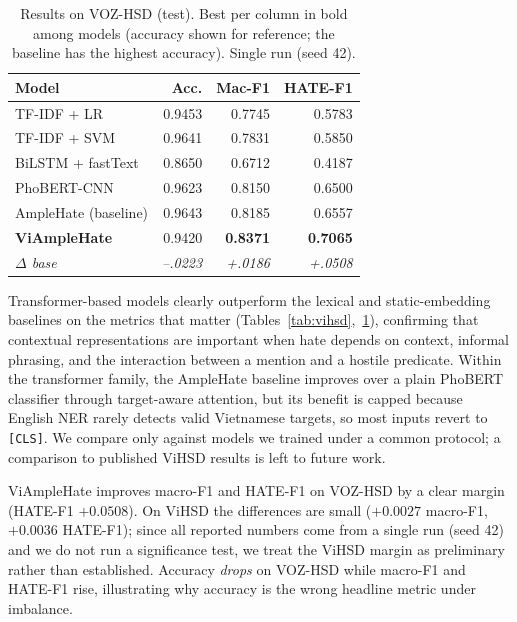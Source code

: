 \documentclass[11pt]{article}
\begin{document}
\begin{table}[t]
  \centering
  \small
  \begin{tabular}{lrrr}
    \toprule
    \textbf{Model} & \textbf{Acc.} & \textbf{Mac-F1} & \textbf{HATE-F1} \\
    \midrule
    TF-IDF + LR          & 0.9453 & 0.7745 & 0.5783 \\
    TF-IDF + SVM         & 0.9641 & 0.7831 & 0.5850 \\
    BiLSTM + fastText    & 0.8650 & 0.6712 & 0.4187 \\
    PhoBERT-CNN          & 0.9623 & 0.8150 & 0.6500 \\
    AmpleHate (baseline) & 0.9643 & 0.8185 & 0.6557 \\
    \textbf{ViAmpleHate} & 0.9420 & \textbf{0.8371} & \textbf{0.7065} \\
    \textit{$\Delta$ base} & \textit{--.0223} & \textit{+.0186} & \textit{+.0508} \\
    \bottomrule
  \end{tabular}
  \caption{Results on VOZ-HSD (test). Best per column in bold among models (accuracy shown for reference; the baseline has the highest accuracy). Single run (seed 42).}
  \label{tab:voz}
\end{table}

Transformer-based models clearly outperform the lexical and static-embedding baselines on the metrics that matter (Tables~\ref{tab:vihsd},~\ref{tab:voz}), confirming that contextual representations are important when hate depends on context, informal phrasing, and the interaction between a mention and a hostile predicate. Within the transformer family, the AmpleHate baseline improves over a plain PhoBERT classifier through target-aware attention, but its benefit is capped because English NER rarely detects valid Vietnamese targets, so most inputs revert to \texttt{[CLS]}. We compare only against models we trained under a common protocol; a comparison to published ViHSD results is left to future work.

ViAmpleHate improves macro-F1 and HATE-F1 on VOZ-HSD by a clear margin (HATE-F1 $+0.0508$). On ViHSD the differences are small ($+0.0027$ macro-F1, $+0.0036$ HATE-F1); since all reported numbers come from a single run (seed 42) and we do not run a significance test, we treat the ViHSD margin as preliminary rather than established. Accuracy \emph{drops} on VOZ-HSD while macro-F1 and HATE-F1 rise, illustrating why accuracy is the wrong headline metric under imbalance.
\end{document}
